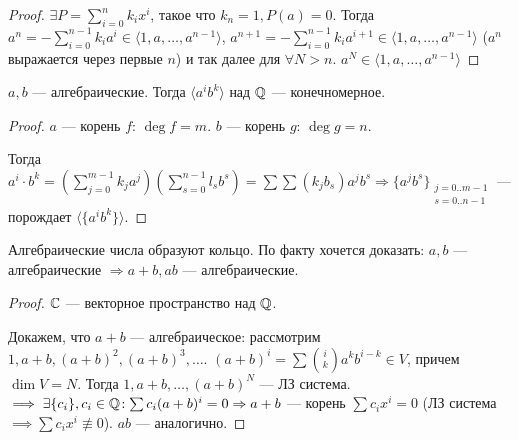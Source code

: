 \begin{proof}
    $\exists P = \sum\limits_{i=0}^n k_i x^i$, такое что  $k_n = 1, P(a) = 0$. Тогда $a^n = -\sum\limits_{i=0}^{n-1} k_i a^i \in \langle 1, a, \ldots, a^{n-1} \rangle$, $a^{n+1} = -\sum\limits_{i=0}^{n-1} k_i a^{i+1} \in \langle 1, a, \ldots, a^{n-1} \rangle$  ($a^n$ выражается через первые $n$)  и так далее для  $\forall N > n$.  $a^N \in \langle 1, a,\ldots, a^{n-1} \rangle$
\end{proof}
\begin{statement}
    $a, b$ --- алгебраические. Тогда  $\langle a^i b^k \rangle$ над $\mathbb{Q}$ --- конечномерное. 
\end{statement}
\begin{proof}
    $a$ --- корень  $f$:  $\deg f = m$.  $b$ --- корень  $g$:  $\deg g = n$.
    
    Тогда  $a^i \cdot b^k = (\sum\limits_{j=0}^{m-1} k_j a^j)(\sum\limits_{s=0}^{n-1} l_s b^s) = \sum \sum (k_j b_s)a^j b^s \Rightarrow \{ a^j b^s\}_{\substack{j = 0..m-1 \\ s = 0..n-1}}$ --- порождает  $\langle \{a^i b^k\} \rangle$.
\end{proof}
\begin{theorem}
    Алгебраические числа образуют кольцо. По факту хочется доказать: $a, b$ --- алгебраические  $\Rightarrow a + b, ab$ --- алгебраические.
\end{theorem}
\begin{proof}
    $\mathbb{C}$ --- векторное пространство над  $\mathbb{Q}$. 

    Докажем, что $a+b$ --- алгебраическое: рассмотрим  $1, a+b, (a+b)^2, (a+b)^3, \ldots$. $(a+b)^i = \sum \binom{i}{k} a^k b^{i-k} \in V$, причем  $\dim V = N$. Тогда  $1, a+b, \ldots, (a+b)^N$ --- ЛЗ система. $\implies \exists \{c_i\}, c_i \in \mathbb{Q}\!: \sum c_i(a+b)^i = 0 \Rightarrow a+b$ --- корень  $\sum c_i x^i = 0$ (ЛЗ система $\implies \sum c_ix^i \not\equiv 0$).  $ab$ --- аналогично.
\end{proof}

